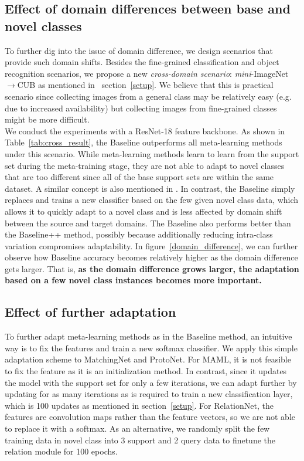 \subsection{Effect of domain differences between base and novel classes}
\label{sec:domaindiff}
To further dig into the issue of domain difference, we design scenarios that provide such domain shifts. Besides the fine-grained classification and object recognition scenarios, we propose a new \emph{cross-domain scenario}: \emph{mini}-ImageNet $\rightarrow$CUB as mentioned in ~section~\ref{setup}. 
We believe that this is practical scenario since collecting images from a general class may be relatively easy (e.g. due to increased availability) but collecting images from fine-grained classes might be more difficult. \\

We conduct the experiments with a ResNet-18 feature backbone. As shown in Table~\ref{tab:cross_result}, the Baseline outperforms all meta-learning methods under this scenario. While meta-learning methods learn to learn from the support set during the meta-training stage, they are not able to adapt to novel classes that are too different since all of the base support sets are within the same dataset. A similar concept is also mentioned in \cite{vinyals2016matching}. In contrast, the Baseline simply replaces and trains a new classifier based on the few given novel class data, which allows it to quickly adapt to a novel class and is less affected by domain shift between the source and target domains. The Baseline also performs better than the Baseline++ method, possibly because additionally reducing intra-class variation compromises adaptability. In figure~\ref{domain_difference}, we can further observe how Baseline accuracy becomes relatively higher as the domain difference gets larger. That is, \textbf{as the domain difference grows larger, the adaptation based on a few novel class instances becomes more important.} 

\subsection{Effect of further adaptation}
\label{ssec:adapt}
To further adapt meta-learning methods as in the Baseline method, an intuitive way is to fix the features and train a new softmax classifier. We apply this simple adaptation scheme to MatchingNet and ProtoNet. For MAML, it is not feasible to fix the feature as it is an initialization method. In contrast, since it updates the model with the support set for only a few iterations, we can adapt further by updating for as many iterations as is required to train a new classification layer, which is 100 updates as mentioned in section~\ref{setup}. For RelationNet, the features are convolution maps rather than the feature vectors, so we are not able to replace it with a softmax. As an alternative, we randomly split the few training data in novel class into 3 support and 2 query data to finetune the relation module for 100 epochs.

